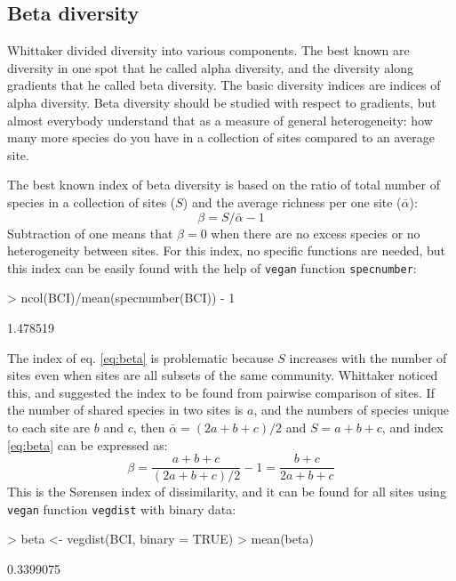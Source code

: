 \documentclass[a4paper,10pt]{amsart}
\begin{document}
\subsection{Beta diversity}

Whittaker divided diversity into various components. The best known
are diversity in one spot that he called alpha diversity, and the
diversity along gradients that he called beta diversity. The basic
diversity indices are indices of alpha diversity. Beta diversity
should be studied with respect to gradients, but almost everybody
understand that as a measure of general heterogeneity: how many more
species do you have in a collection of sites compared to an average
site.

The best known index of beta diversity is based on the ratio of total
number of species in a collection of sites ($S$) and the average
richness per one site ($\bar \alpha$):
\begin{equation}
  \label{eq:beta}
  \beta = S/\bar \alpha - 1
\end{equation}
Subtraction of one means that $\beta = 0$ when there are no excess
species or no heterogeneity between sites. For this index, no specific
functions are needed, but this index can be easily found with the help
of \texttt{vegan} function \texttt{specnumber}:
\begin{Schunk}
\begin{Sinput}
> ncol(BCI)/mean(specnumber(BCI)) - 1
\end{Sinput}
\begin{Soutput}
[1] 1.478519
\end{Soutput}
\end{Schunk}

The index of eq. \ref{eq:beta} is problematic because $S$ increases
with the number of sites even when sites are all subsets of the same
community.  Whittaker noticed this, and suggested the index to be
found from pairwise comparison of sites. If the number of shared
species in two sites is $a$, and the numbers of species unique to each
site are $b$ and $c$, then $\bar \alpha = (2a + b + c)/2$ and $S =
a+b+c$, and index \ref{eq:beta} can be expressed as:
\begin{equation}
  \label{eq:betabray}
  \beta = \frac{a+b+c}{(2a+b+c)/2} - 1 = \frac{b+c}{2a+b+c}
\end{equation}
This is the S{\o}rensen index of dissimilarity, and it can be found
for all sites using \texttt{vegan} function \texttt{vegdist} with
binary data:
\begin{Schunk}
\begin{Sinput}
> beta <- vegdist(BCI, binary = TRUE)
> mean(beta)
\end{Sinput}
\begin{Soutput}
[1] 0.3399075
\end{Soutput}
\end{Schunk}
\end{document}
